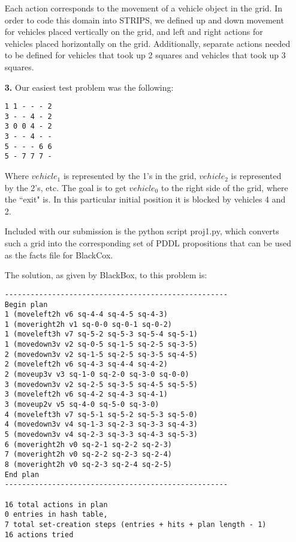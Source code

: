 \documentclass{article}
\begin{document}
\begin{enumerate}
Each action corresponds to the movement of a vehicle object in the grid.
In order to code this domain into STRIPS, we defined up and down
movement for vehicles placed vertically on the grid, and left and right
actions for vehicles placed horizontally on the grid. Additionally,
separate actions needed to be defined for vehicles that took up 2
squares and vehicles that took up 3 squares.

\newpage

\item[\textbf{3.}]
Our easiest test problem was the following:

\begin{small}
\begin{verbatim}
1 1 - - - 2
3 - - 4 - 2
3 0 0 4 - 2
3 - - 4 - -
5 - - - 6 6
5 - 7 7 7 -
\end{verbatim}
\end{small}

Where $vehicle_1$ is represented by the 1's in the grid, $vehicle_2$ is
represented by the 2's, etc. The goal is to get $vehicle_0$ to the right
side of the grid, where the ``exit" is. In this particular initial
position it is blocked by vehicles 4 and 2.

Included with our submission is the python script proj1.py, which
converts such a grid into the corresponding set of PDDL propositions
that can be used as the facts file for BlackCox.

The solution, as given by BlackBox, to this problem is:

\begin{small}
\begin{verbatim}
----------------------------------------------------
Begin plan
1 (moveleft2h v6 sq-4-4 sq-4-5 sq-4-3)
1 (moveright2h v1 sq-0-0 sq-0-1 sq-0-2)
1 (moveleft3h v7 sq-5-2 sq-5-3 sq-5-4 sq-5-1)
1 (movedown3v v2 sq-0-5 sq-1-5 sq-2-5 sq-3-5)
2 (movedown3v v2 sq-1-5 sq-2-5 sq-3-5 sq-4-5)
2 (moveleft2h v6 sq-4-3 sq-4-4 sq-4-2)
2 (moveup3v v3 sq-1-0 sq-2-0 sq-3-0 sq-0-0)
3 (movedown3v v2 sq-2-5 sq-3-5 sq-4-5 sq-5-5)
3 (moveleft2h v6 sq-4-2 sq-4-3 sq-4-1)
3 (moveup2v v5 sq-4-0 sq-5-0 sq-3-0)
4 (moveleft3h v7 sq-5-1 sq-5-2 sq-5-3 sq-5-0)
4 (movedown3v v4 sq-1-3 sq-2-3 sq-3-3 sq-4-3)
5 (movedown3v v4 sq-2-3 sq-3-3 sq-4-3 sq-5-3)
6 (moveright2h v0 sq-2-1 sq-2-2 sq-2-3)
7 (moveright2h v0 sq-2-2 sq-2-3 sq-2-4)
8 (moveright2h v0 sq-2-3 sq-2-4 sq-2-5)
End plan
----------------------------------------------------

16 total actions in plan
0 entries in hash table, 
7 total set-creation steps (entries + hits + plan length - 1)
16 actions tried
\end{verbatim}
\end{small}


\end{enumerate}
\end{document}
